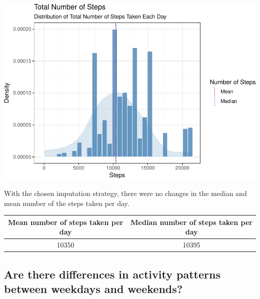 \documentclass[]{article}
\newenvironment{Shaded}{\begin{snugshade}}{\end{snugshade}}
\newcommand{\KeywordTok}[1]{\textcolor[rgb]{0.13,0.29,0.53}{\textbf{#1}}}
\newcommand{\DataTypeTok}[1]{\textcolor[rgb]{0.13,0.29,0.53}{#1}}
\newcommand{\StringTok}[1]{\textcolor[rgb]{0.31,0.60,0.02}{#1}}
\newcommand{\OtherTok}[1]{\textcolor[rgb]{0.56,0.35,0.01}{#1}}
\newcommand{\OperatorTok}[1]{\textcolor[rgb]{0.81,0.36,0.00}{\textbf{#1}}}
\newcommand{\NormalTok}[1]{#1}
\begin{document}
\begin{center}\includegraphics{figure/histogram of complete steps-1} \end{center}

With the chosen imputation strategy, there were no changes in the median
and mean number of the steps taken per day.

\begin{Shaded}
\end{Shaded}

\begin{longtable}[]{@{}cc@{}}
\toprule
Mean number of steps taken per day & Median number of steps taken per
day\tabularnewline
\midrule
\endhead
10350 & 10395\tabularnewline
\bottomrule
\end{longtable}

\subsection{Are there differences in activity patterns between weekdays
and
weekends?}\label{are-there-differences-in-activity-patterns-between-weekdays-and-weekends}
\end{document}
